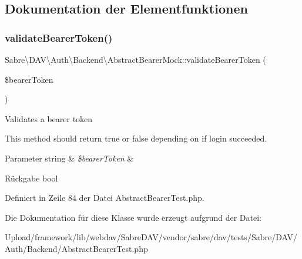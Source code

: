 \subsection{Dokumentation der Elementfunktionen}
\mbox{\label{class_sabre_1_1_d_a_v_1_1_auth_1_1_backend_1_1_abstract_bearer_mock_a16162ddd0f80118307a88824d67ce63c}} 
\subsubsection{\texorpdfstring{validate\+Bearer\+Token()}{validateBearerToken()}}
{\footnotesize\ttfamily Sabre\textbackslash{}\+D\+A\+V\textbackslash{}\+Auth\textbackslash{}\+Backend\textbackslash{}\+Abstract\+Bearer\+Mock\+::validate\+Bearer\+Token (\begin{DoxyParamCaption}\item[{}]{\$bearer\+Token }\end{DoxyParamCaption})}

Validates a bearer token

This method should return true or false depending on if login succeeded.


\begin{DoxyParams}[1]{Parameter}
string & {\em \$bearer\+Token} & \\
\hline
\end{DoxyParams}
\begin{DoxyReturn}{Rückgabe}
bool 
\end{DoxyReturn}


Definiert in Zeile 84 der Datei Abstract\+Bearer\+Test.\+php.



Die Dokumentation für diese Klasse wurde erzeugt aufgrund der Datei\+:\begin{DoxyCompactItemize}
\item 
Upload/framework/lib/webdav/\+Sabre\+D\+A\+V/vendor/sabre/dav/tests/\+Sabre/\+D\+A\+V/\+Auth/\+Backend/Abstract\+Bearer\+Test.\+php\end{DoxyCompactItemize}
